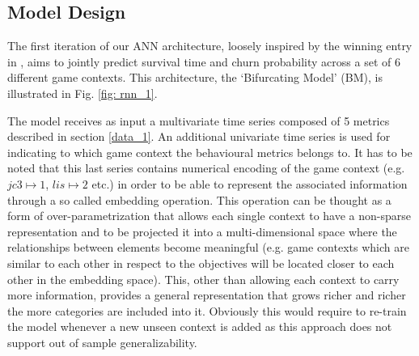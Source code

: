 \subsection{Model Design}
\label{model_design_1}
The first iteration of our ANN architecture, loosely inspired by the winning entry in \cite{lee2018game}, aims to jointly predict survival time and churn probability across a set of 6 different game contexts. This architecture, the `Bifurcating Model' (BM), is illustrated in Fig. \ref{fig: rnn_1}. 

The model receives as input a multivariate time series composed of 5 metrics described in section \ref{data_1}. An additional univariate time series is used for indicating to which game context the behavioural metrics belongs to.  It has to be noted that this last series contains numerical encoding of the game context (e.g. $jc3 \mapsto 1$, $lis \mapsto 2$ etc.) in order to be able to represent the associated information through a so called embedding operation. This operation can be thought as a form of over-parametrization that allows each single context to have a non-sparse representation and to be projected it into a multi-dimensional space where the relationships between elements become meaningful (e.g. game contexts which are similar to each other in respect to the objectives will be located closer to each other in the embedding space). This, other than allowing each context to carry more information, provides a general representation that grows richer and richer the more categories are included into it. Obviously this would require to re-train the model whenever a new unseen context is added as this approach does not support out of sample generalizability.
